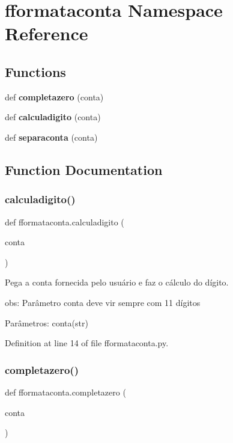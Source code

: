 \section{fformataconta Namespace Reference}
\label{namespacefformataconta}
\subsection*{Functions}
\begin{DoxyCompactItemize}
\item 
def \textbf{ completazero} (conta)
\item 
def \textbf{ calculadigito} (conta)
\item 
def \textbf{ separaconta} (conta)
\end{DoxyCompactItemize}


\subsection{Function Documentation}
\mbox{\label{namespacefformataconta_a54eccd58917253051025d883525478f6}} 
\subsubsection{calculadigito()}
{\footnotesize\ttfamily def fformataconta.\+calculadigito (\begin{DoxyParamCaption}\item[{}]{conta }\end{DoxyParamCaption})}

\begin{DoxyVerb}Pega a conta fornecida pelo usuário e faz o cálculo do dígito.

obs: Parâmetro conta deve vir sempre com 11 dígitos

Parâmetros:
conta(str)
\end{DoxyVerb}
 

Definition at line 14 of file fformataconta.\+py.

\mbox{\label{namespacefformataconta_acf75261e231c878a1fd181faf602e165}} 
\subsubsection{completazero()}
{\footnotesize\ttfamily def fformataconta.\+completazero (\begin{DoxyParamCaption}\item[{}]{conta }\end{DoxyParamCaption})}

